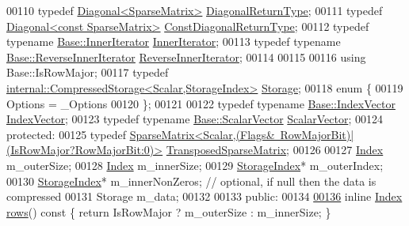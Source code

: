 \begin{DoxyCode}
00110     \textcolor{keyword}{typedef} \hyperlink{group___core___module_class_eigen_1_1_diagonal}{Diagonal<SparseMatrix>} \hyperlink{group___core___module_class_eigen_1_1_diagonal}{DiagonalReturnType};
00111     \textcolor{keyword}{typedef} \hyperlink{group___core___module_class_eigen_1_1_diagonal}{Diagonal<const SparseMatrix>} 
      \hyperlink{group___core___module_class_eigen_1_1_diagonal}{ConstDiagonalReturnType};
00112     \textcolor{keyword}{typedef} \textcolor{keyword}{typename} \hyperlink{class_eigen_1_1_sparse_compressed_base_1_1_inner_iterator}{Base::InnerIterator} \hyperlink{class_eigen_1_1_sparse_compressed_base_1_1_inner_iterator}{InnerIterator};
00113     \textcolor{keyword}{typedef} \textcolor{keyword}{typename} \hyperlink{class_eigen_1_1_sparse_compressed_base_1_1_reverse_inner_iterator}{Base::ReverseInnerIterator} 
      \hyperlink{class_eigen_1_1_sparse_compressed_base_1_1_reverse_inner_iterator}{ReverseInnerIterator};
00114     
00115 
00116     \textcolor{keyword}{using} Base::IsRowMajor;
00117     \textcolor{keyword}{typedef} \hyperlink{class_eigen_1_1internal_1_1_compressed_storage}{internal::CompressedStorage<Scalar,StorageIndex>}
       \hyperlink{class_eigen_1_1internal_1_1_compressed_storage}{Storage};
00118     \textcolor{keyword}{enum} \{
00119       Options = \_Options
00120     \};
00121 
00122     \textcolor{keyword}{typedef} \textcolor{keyword}{typename} \hyperlink{group___core___module}{Base::IndexVector} \hyperlink{group___core___module}{IndexVector};
00123     \textcolor{keyword}{typedef} \textcolor{keyword}{typename} \hyperlink{group___core___module}{Base::ScalarVector} \hyperlink{group___core___module}{ScalarVector};
00124   \textcolor{keyword}{protected}:
00125     \textcolor{keyword}{typedef} \hyperlink{group___sparse_core___module_class_eigen_1_1_sparse_matrix}{SparseMatrix<Scalar,(Flags&~RowMajorBit)|(IsRowMajor?RowMajorBit:0)>}
       \hyperlink{group___sparse_core___module_class_eigen_1_1_sparse_matrix}{TransposedSparseMatrix};
00126 
00127     \hyperlink{group___core___module_a554f30542cc2316add4b1ea0a492ff02}{Index} m\_outerSize;
00128     \hyperlink{group___core___module_a554f30542cc2316add4b1ea0a492ff02}{Index} m\_innerSize;
00129     \hyperlink{group___sparse_core___module_a0b540ba724726ebe953f8c0df06081ed}{StorageIndex}* m\_outerIndex;
00130     \hyperlink{group___sparse_core___module_a0b540ba724726ebe953f8c0df06081ed}{StorageIndex}* m\_innerNonZeros;     \textcolor{comment}{// optional, if null then the data is compressed}
00131     Storage m\_data;
00132 
00133   \textcolor{keyword}{public}:
00134     
\hyperlink{group___sparse_core___module_a62e61bb861eee306d5b069ce652b5aa5}{00136}     \textcolor{keyword}{inline} \hyperlink{group___core___module_a554f30542cc2316add4b1ea0a492ff02}{Index} \hyperlink{group___sparse_core___module_a62e61bb861eee306d5b069ce652b5aa5}{rows}()\textcolor{keyword}{ const }\{ \textcolor{keywordflow}{return} IsRowMajor ? m\_outerSize : m\_innerSize; \}

\end{DoxyCode}

